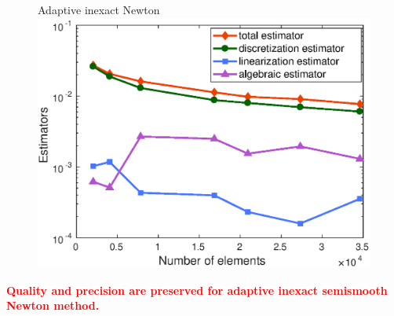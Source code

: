 \documentclass[aspectratio=169]{beamer}
\begin{document}
\begin{frame}
\begin{figure}
\begin{minipage}[c]{.33\linewidth}
\end{minipage}\hfill
\begin{minipage}[c]{.33\linewidth}
   \centering
   Adaptive inexact Newton
\includegraphics[width=\textwidth]{fig_article_chap_1/adapt_inexact_resolution_convergence_estimator_number_elements.eps}     
\end{minipage}
\end{figure}

\textcolor{red}{\textbf{Quality and precision are preserved for adaptive inexact semismooth Newton method.}}


\end{frame}
\end{document}
